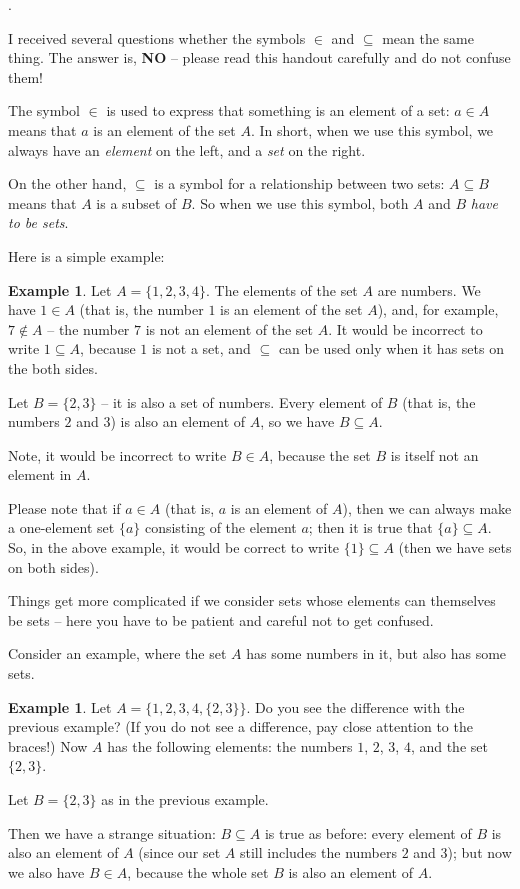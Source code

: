 \documentclass[12pt]{amsart}
\theoremstyle{plain}
\theoremstyle{definition}
\newtheorem{example}[thm]{Example}
\begin{document}
{.} 

\medskip
I received several questions whether the symbols $\in$ and $\subseteq$ mean the same thing. 
The answer is, {\bf NO} -- please read this handout carefully and do not confuse them! 

\medskip

The symbol $\in$ is used to express that something is an element of a set:
$a\in A$ means that $a$ is an element of the set $A$. In short, when we use this symbol,
we always have an \emph{element} on the left, and a \emph{set} on the right.

On the other hand, $\subseteq$ is a symbol for a relationship between two sets:
$A\subseteq B$ means that $A$ is a subset of $B$. 
So when we use this symbol, both $A$ and $B$ \emph{have to be  sets}. 

Here is a simple example:

\begin{example}
Let $A=\{1, 2,3,4\}$. The elements of the set $A$ are numbers. 
We have $1\in A$ (that is, the number $1$ is an element of the set $A$), 
and, for example,  $7\notin A$ -- the number $7$ is not an element of the set $A$.
It would be incorrect to write $1\subseteq A$, because $1$ is not a set, and $\subseteq$ can be used only when it has sets on the both sides. 


Let $B=\{2, 3\}$ -- it is also a set of numbers. Every element of $B$ (that  is, the numbers $2$ and $3$)  is also an element of $A$, so we have $B\subseteq A$. 

Note, it would be incorrect to write $B\in A$, because the set $B$ is itself not an element in $A$. 
\end{example} 

Please note that if $a\in A$ (that is, $a$ is an element of $A$), then we can always make a one-element set $\{a\}$ consisting of the element $a$; then it is true that 
$\{a\}\subseteq A$. So, in the above example, it would be correct to write 
$\{1\}\subseteq A$ (then we have sets on both sides). 
\medskip

Things get more complicated if we consider sets whose elements can themselves be sets -- here you have to be patient and careful not to get confused. 

Consider an example, where the set $A$ has some numbers in it, but also has some sets.

\begin{example}
Let $A=\{1,2,3,4, \{2, 3\}\}$. Do you see the difference with the previous example?
(If you do not see a difference, pay close attention to the braces!)
Now $A$ has the following elements: the numbers $1$, $2$, $3$, $4$, and the set 
$\{2,3\}$.

Let $B=\{2,3\}$ as in the previous example.

Then we have a strange situation: $B\subseteq A$ is true as before: every element of $B$ is also an element of $A$ (since our set $A$ still includes the numbers $2$ and $3$); 
but now we also have $B\in A$, because the whole set $B$ is also an element of $A$. 
\end{example}
\end{document}
